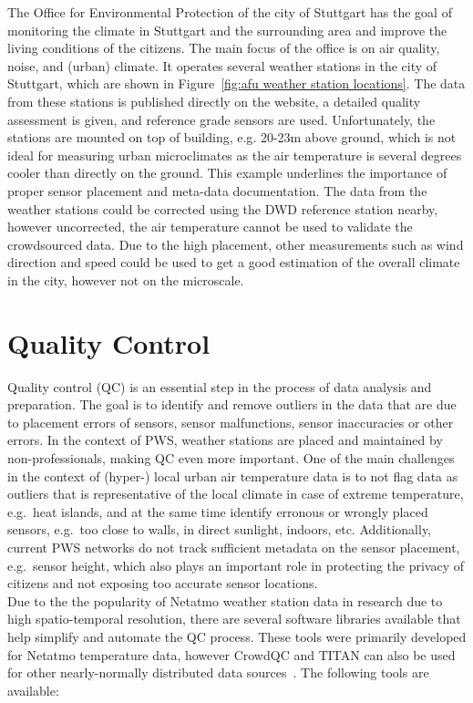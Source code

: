 The Office for Environmental Protection of the city of Stuttgart has the goal of monitoring the climate in Stuttgart and the surrounding area and improve the living conditions of the citizens. The main focus of the office is on air quality, noise, and (urban) climate. It operates several weather stations in the city of Stuttgart, which are shown in Figure~\ref{fig:afu weather station locations}. The data from these stations is published directly on the website, a detailed quality assessment is given, and reference grade sensors are used. Unfortunately, the stations are mounted on top of building, e.g. 20-23m above ground, which is not ideal for measuring urban microclimates as the air temperature is several degrees cooler than directly on the ground. This example underlines the importance of proper sensor placement and meta-data documentation. The data from the weather stations could be corrected using the DWD reference station nearby, however uncorrected, the air temperature cannot be used to validate the crowdsourced data. Due to the high placement, other measurements such as wind direction and speed could be used to get a good estimation of the overall climate in the city, however not on the microscale.


\section{Quality Control}
\label{sec:quality control}

Quality control (QC) is an essential step in the process of data analysis and preparation. The goal is to identify and remove outliers in the data that are due to placement errors of sensors, sensor malfunctions, sensor inaccuracies or other errors. In the context of PWS, weather stations are placed and maintained by non-professionals, making QC even more important. One of the main challenges in the context of (hyper-) local urban air temperature data is to not flag data as outliers that is representative of the local climate in case of extreme temperature, e.g.\ heat islands, and at the same time identify erronous or wrongly placed sensors, e.g.\ too close to walls, in direct sunlight, indoors, etc. Additionally, current PWS networks do not track sufficient metadata on the sensor placement, e.g.\ sensor height, which also plays an important role in protecting the privacy of citizens and not exposing too accurate sensor locations.\\
Due to the the popularity of Netatmo weather station data in research due to high spatio-temporal resolution, there are several software libraries available that help simplify and automate the QC process. These tools were primarily developed for Netatmo temperature data, however CrowdQC and TITAN can also be used for other nearly-normally distributed data sources~\cite{hahn2022observations}. The following tools are available:


